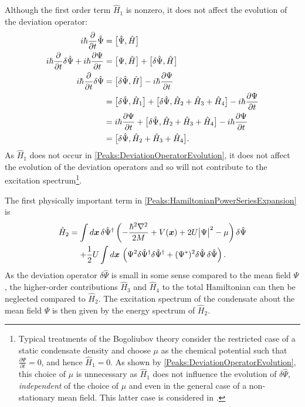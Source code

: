 Although the first order term $\hat{H}_1$ is nonzero, it does not affect the evolution of the deviation operator:
\begin{align}
    i \hbar \frac{\partial }{\partial t}\hat{\Psi} &= \comm{\hat{\Psi}, \hat{H}}\\
    i \hbar \frac{\partial }{\partial t}\delta{\hat{\Psi}} + i \hbar \frac{\partial \Psi}{\partial t} &= \comm{\Psi, \hat{H}} + \comm{\delta\hat{\Psi}, \hat{H}}\\
    i \hbar \frac{\partial }{\partial t}\delta \hat{\Psi} &= \comm{\delta \hat{\Psi}, \hat{H}} - i \hbar \frac{\partial  \Psi}{\partial t}\\
    &= \comm{\delta \hat{\Psi}, \hat{H}_1} + \comm{\delta \hat{\Psi}, \hat{H}_2 + \hat{H}_3 + \hat{H}_4} - i \hbar \frac{\partial\Psi }{\partial t}\\
    &= i \hbar \frac{\partial \Psi}{\partial t} + \comm{\delta \hat{\Psi}, \hat{H}_2 + \hat{H}_3 + \hat{H}_4} - i \hbar \frac{\partial \Psi}{\partial t}\\
    &= \comm{\delta \hat{\Psi}, \hat{H}_2 + \hat{H}_3 + \hat{H}_4}. \label{Peaks:DeviationOperatorEvolution}
\end{align}
As $\hat{H}_1$ does not occur in \eqref{Peaks:DeviationOperatorEvolution}, it does not affect the evolution of the deviation operators and so will not contribute to the excitation spectrum\footnote{Typical treatments of the Bogoliubov theory consider the restricted case of a static condensate density and choose $\mu$ as the chemical potential such that $\displaystyle \frac{\partial \Psi}{\partial t} = 0$, and hence $\hat{H}_1=0$. As shown by \eqref{Peaks:DeviationOperatorEvolution}, this choice of $\mu$ is unnecessary as $\hat{H}_1$ does not influence the evolution of $\delta\hat{\Psi}$, \emph{independent} of the choice of $\mu$ and even in the general case of a non-stationary mean field. This latter case is considered in .}.

The first physically important term in \eqref{Peaks:HamiltonianPowerSeriesExpansion} is
\begin{align}
    \begin{split}
        \hat{H}_2 &= \int d \vect{x}\, \delta \hat{\Psi}^\dagger \left(-\frac{\hbar^2 \nabla^2}{2 M} + V(\vect{x}) + 2 U\big|\Psi\big|^2 -\mu \right)\delta\hat{\Psi}\\
         &\relphantom{=} + \frac{1}{2} U\int d \vect{x}\, \left(\Psi^2 \delta \hat{\Psi}^\dagger\delta \hat{\Psi}^\dagger  +  (\Psi^*)^2 \delta \hat{\Psi} \,\delta \hat{\Psi}\right).
    \end{split}
    \label{Peaks:HamiltonianPowerSeriesQuadraticTerm}
\end{align}
As the deviation operator $\delta \hat{\Psi}$ is small in some sense compared to the mean field $\Psi$, the higher-order contributions $\hat{H}_3$ and $\hat{H}_4$ to the total Hamiltonian can then be neglected compared to $\hat{H}_2$. The excitation spectrum of the condensate about the mean field $\Psi$ is then given by the energy spectrum of $\hat{H}_2$.

